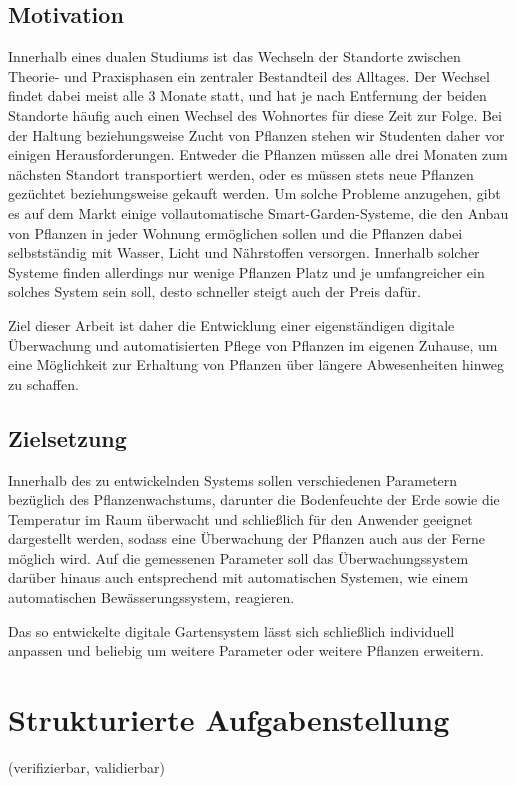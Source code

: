 \documentclass[
    load-dhbw-templates,
    load-preamble = true,
    auto-intro-pages = all,
    add-tocs-to-toc,
    debug = true,
    language = english,
    mainlanguage = ngerman,
    add-bibliography,
    bib-file = dhbw-source.bib,
    biblatex/style = alphabetic, 
]{iodhbwm}
\begin{document}
    \section{Motivation}
    Innerhalb eines dualen Studiums ist das Wechseln der Standorte zwischen Theorie- und Praxisphasen ein zentraler Bestandteil des Alltages. Der Wechsel findet dabei meist alle 3 Monate statt, und hat je nach Entfernung der beiden Standorte häufig auch einen Wechsel des Wohnortes für diese Zeit zur Folge. Bei der Haltung beziehungsweise Zucht von Pflanzen stehen wir Studenten daher vor einigen Herausforderungen.
    Entweder die Pflanzen müssen alle drei Monaten zum nächsten Standort transportiert werden, oder es müssen stets neue Pflanzen gezüchtet beziehungsweise gekauft werden. Um solche Probleme anzugehen, gibt es auf dem Markt einige vollautomatische Smart-Garden-Systeme, die den Anbau von Pflanzen in jeder Wohnung ermöglichen sollen und die Pflanzen dabei selbstständig mit Wasser, Licht und Nährstoffen versorgen. Innerhalb solcher Systeme finden allerdings nur wenige Pflanzen Platz und je umfangreicher ein solches System sein soll, desto schneller steigt auch der Preis dafür.

    Ziel dieser Arbeit ist daher die Entwicklung einer eigenständigen digitale Überwachung und automatisierten Pflege von Pflanzen im eigenen Zuhause, um eine Möglichkeit zur Erhaltung von Pflanzen über längere Abwesenheiten hinweg zu schaffen.

    \section{Zielsetzung}
    Innerhalb des zu entwickelnden Systems sollen verschiedenen Parametern bezüglich des Pflanzenwachstums, darunter die Bodenfeuchte der Erde sowie die Temperatur im Raum überwacht und schließlich für den Anwender geeignet dargestellt werden, sodass eine Überwachung der Pflanzen auch aus der Ferne möglich wird.  
    Auf die gemessenen Parameter soll das Überwachungssystem darüber hinaus auch entsprechend mit automatischen Systemen, wie einem automatischen Bewässerungssystem, reagieren.

    Das so entwickelte digitale Gartensystem lässt sich schließlich individuell anpassen und beliebig um weitere Parameter oder weitere Pflanzen erweitern.

\chapter{Strukturierte Aufgabenstellung} 
    (verifizierbar, validierbar)
\end{document}
